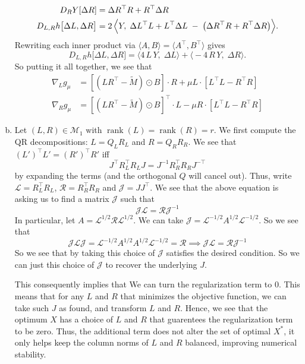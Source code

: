 \documentclass[11pt]{scrartcl}
\begin{document}
\begin{enumerate}[(a)]
\begin{align*}
    D_{R}Y[\Delta R]
    &=\Delta R^{\top}R + R^{\top}\Delta R \\
    D_{L,R}h\bigl[\Delta L,\Delta R\bigr]
    &=2\,\Bigl\langle Y,\;\Delta L^{\top}L + L^{\top}\Delta L
    \;-\;\bigl(\Delta R^{\top}R + R^{\top}\Delta R\bigr)\Bigr\rangle.
    \end{align*}
    Rewriting each inner product via 
    \(\langle A,B\rangle=\langle A^{\top},B^{\top}\rangle\) gives
    \[
    D_{L,R}h\bigl[\Delta L,\Delta R\bigr]
    =\bigl\langle 4\,L\,Y,\;\Delta L\bigr\rangle
    +\bigl\langle -4\,R\,Y,\;\Delta R\bigr\rangle.
    \]
    So putting it all together, we see that \begin{align*}
        \nabla_L g_\mu &= \left[(LR^\top - \tilde M) \odot B \right] \cdot R + \mu L \cdot \left[L^\top L - R^\top R\right] \\
        \nabla_R g_\mu &= \left[(LR^\top - \tilde M) \odot B\right]^\top \cdot L - \mu R \cdot \left[L^\top L - R^\top R\right]
    \end{align*}
    \item Let $(L,R)\in\mathcal{M}_1$ with $\operatorname{rank}(L)=\operatorname{rank}(R)=r$. We first compute the QR decompositions: $L = Q_L R_L$ and $R = Q_R R_R$. We see that $(L')^\top L' = (R')^\top R'$ iff \[J^\top R_L^\top R_L J = J^{-1}R_R^\top R_R J^{-\top}\]
    by expanding the terms (and the orthogonal $Q$ will cancel out). Thus, write $\mathcal L = R_L^\top R_L$, $\mathcal R = R_R^\top R_R$ and $\mathcal J = JJ^\top$. We see that the above equation is asking us to find a matrix $\mathcal J$ such that \[\mathcal J \mathcal L = \mathcal R \mathcal J^{-1}\]
    In particular, let $A = \mathcal L^{1/2} \mathcal R \mathcal L^{1/2}$. We can take $\mathcal J = \mathcal L^{-1/2}A^{1/2}\mathcal L^{-1/2}$. So we see that \[\mathcal {JLJ} = \mathcal L^{-1/2} A^{1/2} A^{1/2}\mathcal L^{-1/2} = \mathcal R \implies \mathcal J \mathcal L = \mathcal R \mathcal J^{-1}\]
    So we see that by taking this choice of $\mathcal J$ satisfies the desired condition. So we can just this choice of $\mathcal J$ to recover the underlying $J$.

    This consequently implies that We can turn the regularization term to 0. This means that for any $L$ and $R$ that minimizes the objective function, we can take such $J$ as found, and transform $L$ and $R$. Hence, we see that the optimum $X$ has a choice of $L$ and $R$ that guarentees the regularization term to be zero. Thus, the additional term does not alter the set of optimal $X^*$, it only helps keep the column norms of $L$ and $R$ balanced, improving numerical stability.
\end{enumerate}
\end{document}
